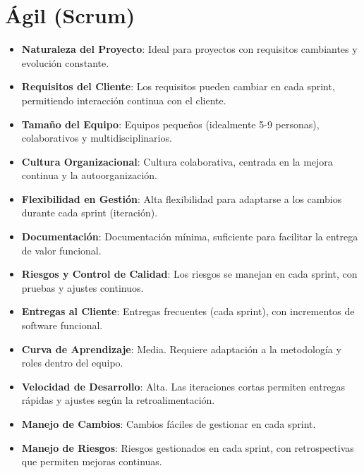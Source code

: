 \section{Ágil (Scrum)}
\begin{itemize}
    \item \textbf{Naturaleza del Proyecto}: Ideal para proyectos con requisitos cambiantes y evolución constante.
    \item \textbf{Requisitos del Cliente}: Los requisitos pueden cambiar en cada sprint, permitiendo interacción continua con el cliente.
    \item \textbf{Tamaño del Equipo}: Equipos pequeños (idealmente 5-9 personas), colaborativos y multidisciplinarios.
    \item \textbf{Cultura Organizacional}: Cultura colaborativa, centrada en la mejora continua y la autoorganización.
    \item \textbf{Flexibilidad en Gestión}: Alta flexibilidad para adaptarse a los cambios durante cada sprint (iteración).
    \item \textbf{Documentación}: Documentación mínima, suficiente para facilitar la entrega de valor funcional.
    \item \textbf{Riesgos y Control de Calidad}: Los riesgos se manejan en cada sprint, con pruebas y ajustes continuos.
    \item \textbf{Entregas al Cliente}: Entregas frecuentes (cada sprint), con incrementos de software funcional.
    \item \textbf{Curva de Aprendizaje}: Media. Requiere adaptación a la metodología y roles dentro del equipo.
    \item \textbf{Velocidad de Desarrollo}: Alta. Las iteraciones cortas permiten entregas rápidas y ajustes según la retroalimentación.
    \item \textbf{Manejo de Cambios}: Cambios fáciles de gestionar en cada sprint.
    \item \textbf{Manejo de Riesgos}: Riesgos gestionados en cada sprint, con retrospectivas que permiten mejoras continuas.
\end{itemize}

